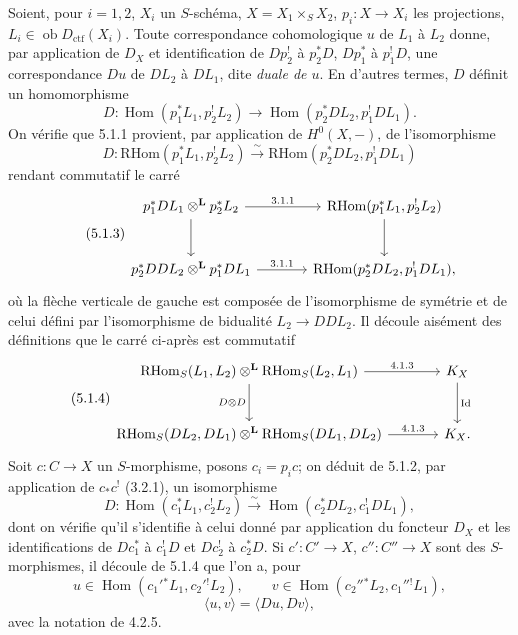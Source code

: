 \documentclass[11pt]{article}
\DeclareMathOperator{\Hom}{Hom}
\providecommand{\RHom}{\mathrm{RHom}}
\providecommand{\RHom}{\mathrm{RHom}}
\providecommand{\Hom}{\operatorname{Hom}}
\providecommand{\RHom}{\mathrm R\mathcal{H}om}
\providecommand{\RHom}{\mathrm{RHom}}
\providecommand{\Hom}{\operatorname{Hom}}
\begin{document}
Soient, pour $i=1,2$, $X_i$ un $S$-schéma, $X=X_1\times_S X_2$, $p_i:X\to X_i$ les projections, $L_i\in\operatorname{ob}D_{\mathrm{ctf}}(X_i)$. Toute correspondance cohomologique $u$ de $L_1$ à $L_2$ donne, par application de $D_X$ et identification de $Dp_2^!$ à $p_2^*D$, $Dp_1^*$ à $p_1^!D$, une correspondance $Du$ de $DL_2$ à $DL_1$, dite \emph{duale de $u$}. En d'autres termes, $D$ définit un homomorphisme
\begin{equation}
\tag{5.1.1}
D:\Hom(p_1^*L_1,p_2^!L_2)\longrightarrow \Hom(p_2^*DL_2,p_1^!DL_1).
\end{equation}
On vérifie que 5.1.1 provient, par application de $H^0(X,-)$, de l'isomorphisme
\begin{equation}
\tag{5.1.2}
D:\RHom(p_1^*L_1,p_2^!L_2)\xrightarrow{\sim}\RHom(p_2^*DL_2,p_1^!DL_1)
\end{equation}
rendant commutatif le carré
\begin{equation}
\tag{5.1.3}
\begin{tikzcd}[column sep=large,row sep=large]
p_1^*DL_1\otimes^{\mathbf L}p_2^*L_2 \arrow[r,"3.1.1"] \arrow[d]
& \RHom(p_1^*L_1,p_2^!L_2) \arrow[d] \\
p_2^*DDL_2\otimes^{\mathbf L}p_1^*DL_1 \arrow[r,"3.1.1"]
& \RHom(p_2^*DL_2,p_1^!DL_1),
\end{tikzcd}
\end{equation}
où la flèche verticale de gauche est composée de l'isomorphisme de symétrie et de celui défini par l'isomorphisme de bidualité $L_2\to DDL_2$. Il découle aisément des définitions que le carré ci-après est commutatif
\begin{equation}
\tag{5.1.4}
\begin{tikzcd}[column sep=large,row sep=large]
\RHom_S(L_1,L_2)\otimes^{\mathbf L}\RHom_S(L_2,L_1) \arrow[r,"4.1.3"] \arrow[d,"D\otimes D"']
& K_X \arrow[d,"\operatorname{Id}"] \\
\RHom_S(DL_2,DL_1)\otimes^{\mathbf L}\RHom_S(DL_1,DL_2) \arrow[r,"4.1.3"]
& K_X.
\end{tikzcd}
\end{equation}
Soit $c:C\to X$ un $S$-morphisme, posons $c_i=p_ic$; on déduit de 5.1.2, par application de $c_*c^!$ (3.2.1), un isomorphisme
\begin{equation}
\tag{5.1.5}
D:\Hom(c_1^*L_1,c_2^!L_2)\xrightarrow{\sim}\Hom(c_2^*DL_2,c_1^!DL_1),
\end{equation}
dont on vérifie qu'il s'identifie à celui donné par application du foncteur $D_X$ et les identifications de $Dc_1^*$ à $c_1^!D$ et $Dc_2^!$ à $c_2^*D$. Si $c':C'\to X$, $c'':C''\to X$ sont des $S$-morphismes, il découle de 5.1.4 que l'on a, pour
\[
u\in\Hom(c_1'{}^*L_1,c_2'{}^!L_2),\qquad v\in\Hom(c_2''{}^*L_2,c_1''{}^!L_1),\]
\begin{equation}
\tag{5.1.6}
\langle u,v\rangle=\langle Du,Dv\rangle,
\end{equation}
avec la notation de 4.2.5.
\end{document}
